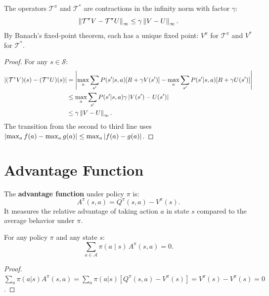 \begin{theorem}
\label{thm:contraction}
The operators $\mathcal{T}^\pi$ and $\mathcal{T}^*$ are contractions in the
infinity norm with factor $\gamma$:
\[
    \left\| \mathcal{T}^\pi V - \mathcal{T}^\pi U \right\|_\infty
    \leq \gamma \left\| V - U \right\|_\infty.
\]
By Banach's fixed-point theorem, each has a unique fixed point:
$V^\pi$ for $\mathcal{T}^\pi$ and $V^*$ for $\mathcal{T}^*$.
\end{theorem}

\begin{proof}
For any $s \in \mathcal{S}$:
\begin{align*}
    \left| (\mathcal{T}^* V)(s) - (\mathcal{T}^* U)(s) \right|
    &= \left| \max_a \sum_{s'} P(s'|s,a)[R + \gamma V(s')]
       - \max_a \sum_{s'} P(s'|s,a)[R + \gamma U(s')] \right| \\
    &\leq \max_a \sum_{s'} P(s'|s,a) \gamma \left| V(s') - U(s') \right| \\
    &\leq \gamma \left\| V - U \right\|_\infty.
\end{align*}
The transition from the second to third line uses
$\left| \max_a f(a) - \max_a g(a) \right| \leq \max_a \left| f(a) - g(a) \right|$.
\end{proof}

\section{Advantage Function}

\begin{definition}
The \textbf{advantage function} under policy $\pi$ is:
\[
    A^\pi(s, a) = Q^\pi(s, a) - V^\pi(s).
\]
It measures the relative advantage of taking action $a$ in state $s$ compared
to the average behavior under $\pi$.
\end{definition}

\begin{proposition}
For any policy $\pi$ and any state $s$:
\[
    \sum_{a \in \mathcal{A}} \pi(a \mid s) \, A^\pi(s, a) = 0.
\]
\end{proposition}

\begin{proof}
$\sum_a \pi(a|s) A^\pi(s,a) = \sum_a \pi(a|s)[Q^\pi(s,a) - V^\pi(s)]
= V^\pi(s) - V^\pi(s) = 0$.
\end{proof}

